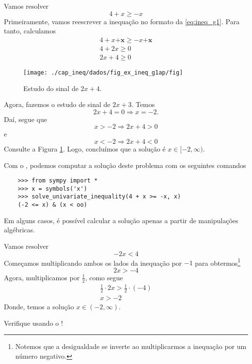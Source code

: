 \begin{ex}
  Vamos resolver
  \begin{equation}
    4 + x \geq -x
  \end{equation}
  Primeiramente, vamos reescrever a inequação no formato da \eqref{eq:ineq_g1}. Para tanto, calculamos
  \begin{gather}
    4 + x \pmb{+ x} \geq - x \pmb{ + x}\\
    4 + 2x \geq 0\\
    2x + 4 \geq 0
  \end{gather}

\begin{figure}[H]
  \centering
  \texttt{[image: ./cap\_ineq/dados/fig\_ex\_ineq\_g1ap/fig]}
  \caption{Estudo do sinal de $2x + 4$.}
  \label{fig:ex_ineq_g1ap}
\end{figure}  
  
  Agora, fazemos o estudo de sinal de $2x + 3$. Temos
  \begin{equation}
    2x + 4 = 0 \Rightarrow x = -2.
  \end{equation}
  Daí, segue que
  \begin{equation}
    x > -2 \Rightarrow 2x + 4 > 0
  \end{equation}
  e
  \begin{equation}
    x < -2 \Rightarrow 2x + 4 < 0
  \end{equation}
  Consulte a Figura \ref{fig:ex_ineq_g1ap}. Logo, concluímos que a solução é $x\in [-2, \infty)$.

  \ifispython
  Com o {\sympy}, podemos computar a solução deste problema com os seguintes comandos
  \begin{lstlisting}
    >>> from sympy import *
    >>> x = symbols('x')
    >>> solve_univariate_inequality(4 + x >= -x, x)
    (-2 <= x) & (x < oo)
  \end{lstlisting}
  \fi
\end{ex}

Em alguns casos, é possível calcular a solução apenas a partir de manipulações algébricas.

\begin{ex}
  Vamos resolver
  \begin{equation}
    - 2x < 4
  \end{equation}
  Começamos multiplicando ambos os lados da inequação por $-1$ para obtermos\footnote{Notemos que a desigualdade se inverte ao multiplicarmos a inequação por um número negativo.}
  \begin{equation}
    2x > -4
  \end{equation}
  Agora, multiplicamos por $\frac{1}{2}$, como segue
  \begin{gather}
    \frac{1}{2}\cdot 2x > \frac{1}{2}\cdot (-4)\\
    x > -2
  \end{gather}
  Donde, temos a solução $x\in (-2, \infty)$.

  \begin{ifispython}
    Verifique usando o {\sympy}!
  \end{ifispython}
\end{ex}

